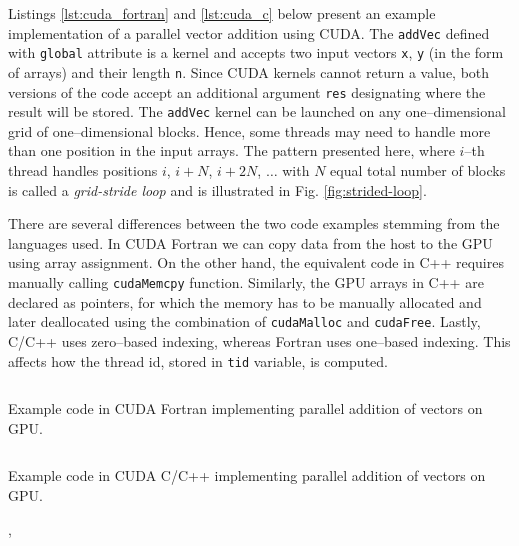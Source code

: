 \begin{example}
Listings \ref{lst:cuda_fortran} and \ref{lst:cuda_c} below present an example implementation of a
parallel vector addition using CUDA. The \texttt{addVec} defined with \texttt{global} attribute is a
kernel and accepts two input vectors \texttt{x}, \texttt{y} (in the form of arrays) and their length
\texttt{n}. Since CUDA kernels cannot return a value, both versions of the code accept an additional
argument \texttt{res} designating where the result will be stored. The \texttt{addVec} kernel can be
launched on any one--dimensional grid of one--dimensional blocks. Hence, some threads may need to
handle more than one position in the input arrays. The pattern presented here, where $i$--th thread
handles positions $i$, $i+N$, $i+2N$, $\ldots$ with $N$ equal total number of blocks is called a
\emph{grid-stride loop} and is illustrated in Fig. \ref{fig:strided-loop}.

There are several differences between the two code examples stemming from the languages used. In
CUDA Fortran we can copy data from the host to the GPU using array assignment. On
the other hand, the equivalent code in C++ requires manually calling \texttt{cudaMemcpy} function.
Similarly, the GPU arrays in C++ are declared as pointers, for which the memory has to be manually
allocated and later deallocated using the combination of \texttt{cudaMalloc} and \texttt{cudaFree}.
Lastly, C/C++ uses zero--based indexing, whereas Fortran uses one--based indexing.
This affects how the thread id, stored in \texttt{tid} variable, is computed.


\begin{listing}
  \inputminted{fortran}{code/cuda_fortran.cuf}
  \caption{Example code in CUDA Fortran implementing parallel addition of vectors on GPU.}
  \label{lst:cuda_fortran}
\end{listing}


\begin{listing}
  \inputminted{cuda}{code/cuda_c.cu}
  \caption{Example code in CUDA C/C++ implementing parallel addition of vectors on GPU.},
  \label{lst:cuda_c}
\end{listing}



\end{example}
